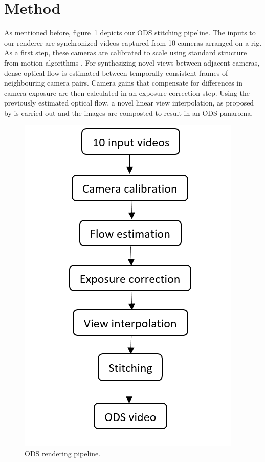 \documentclass[10pt,twocolumn,letterpaper]{article}
\begin{document}
\section{Method}
\label{method}
As mentioned before, figure~\ref{pipeline} depicts our ODS stitching pipeline. The inputs to our renderer are synchronized videos captured from 10 cameras arranged on a rig. As a first step, these cameras are calibrated to scale using standard structure from motion algorithms \cite{sfm}. For synthesizing novel views between adjacent cameras, dense optical flow is estimated between temporally consistent frames of neighbouring camera pairs. Camera gains that compensate for differences in camera exposure are then calculated in an exposure correction step. Using the previously estimated optical flow, a novel linear view interpolation, as proposed by \cite{jump16} is carried out and the images are composted to result in an ODS panaroma.  
\begin{figure}[t]
\begin{center}
   \includegraphics[width=0.5\linewidth]{pictures/pipeline.PNG}
\end{center}
   \caption{ODS rendering pipeline. }
\label{pipeline}
\end{figure}
\end{document}
